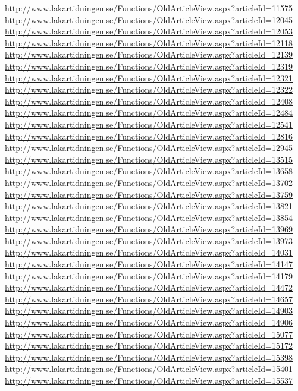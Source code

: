 \documentclass[a4paper]{report}
\begin{document}
\begin{appendices}
\begin{footnotesize}
\url{http://www.lakartidningen.se/Functions/OldArticleView.aspx?articleId=11575}
\url{http://www.lakartidningen.se/Functions/OldArticleView.aspx?articleId=12045}
\url{http://www.lakartidningen.se/Functions/OldArticleView.aspx?articleId=12053}
\url{http://www.lakartidningen.se/Functions/OldArticleView.aspx?articleId=12118}
\url{http://www.lakartidningen.se/Functions/OldArticleView.aspx?articleId=12139}
\url{http://www.lakartidningen.se/Functions/OldArticleView.aspx?articleId=12319}
\url{http://www.lakartidningen.se/Functions/OldArticleView.aspx?articleId=12321}
\url{http://www.lakartidningen.se/Functions/OldArticleView.aspx?articleId=12322}
\url{http://www.lakartidningen.se/Functions/OldArticleView.aspx?articleId=12408}
\url{http://www.lakartidningen.se/Functions/OldArticleView.aspx?articleId=12484}
\url{http://www.lakartidningen.se/Functions/OldArticleView.aspx?articleId=12541}
\url{http://www.lakartidningen.se/Functions/OldArticleView.aspx?articleId=12816}
\url{http://www.lakartidningen.se/Functions/OldArticleView.aspx?articleId=12945}
\url{http://www.lakartidningen.se/Functions/OldArticleView.aspx?articleId=13515}
\url{http://www.lakartidningen.se/Functions/OldArticleView.aspx?articleId=13658}
\url{http://www.lakartidningen.se/Functions/OldArticleView.aspx?articleId=13702}
\url{http://www.lakartidningen.se/Functions/OldArticleView.aspx?articleId=13759}
\url{http://www.lakartidningen.se/Functions/OldArticleView.aspx?articleId=13821}
\url{http://www.lakartidningen.se/Functions/OldArticleView.aspx?articleId=13854}
\url{http://www.lakartidningen.se/Functions/OldArticleView.aspx?articleId=13969}
\url{http://www.lakartidningen.se/Functions/OldArticleView.aspx?articleId=13973}
\url{http://www.lakartidningen.se/Functions/OldArticleView.aspx?articleId=14031}
\url{http://www.lakartidningen.se/Functions/OldArticleView.aspx?articleId=14147}
\url{http://www.lakartidningen.se/Functions/OldArticleView.aspx?articleId=14179}
\url{http://www.lakartidningen.se/Functions/OldArticleView.aspx?articleId=14472}
\url{http://www.lakartidningen.se/Functions/OldArticleView.aspx?articleId=14657}
\url{http://www.lakartidningen.se/Functions/OldArticleView.aspx?articleId=14903}
\url{http://www.lakartidningen.se/Functions/OldArticleView.aspx?articleId=14906}
\url{http://www.lakartidningen.se/Functions/OldArticleView.aspx?articleId=15077}
\url{http://www.lakartidningen.se/Functions/OldArticleView.aspx?articleId=15172}
\url{http://www.lakartidningen.se/Functions/OldArticleView.aspx?articleId=15398}
\url{http://www.lakartidningen.se/Functions/OldArticleView.aspx?articleId=15401}
\url{http://www.lakartidningen.se/Functions/OldArticleView.aspx?articleId=15537}

\end{footnotesize}
\end{appendices}
\end{document}

